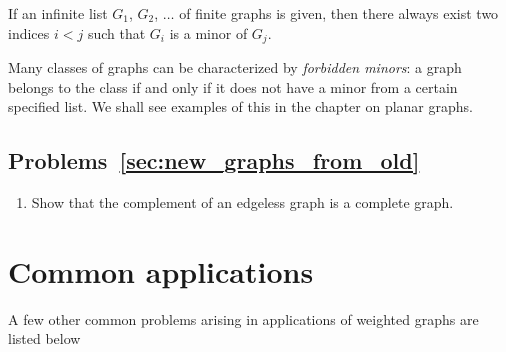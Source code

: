 \begin{theorem}
{\rm
If an infinite list $G_1$, $G_2$, $\dots$ of finite graphs is given, then there always exist two indices
$i < j$ such that $G_i$ is a minor of $G_j$.
}
\end{theorem}

Many classes of graphs can be characterized by {\it forbidden minors}: a
graph belongs to the class if and only if it does not have a minor
from a certain specified list.
We shall see examples of this in the chapter on planar graphs.



\subsection*{Problems~\ref{sec:new_graphs_from_old}}

\begin{enumerate}
\item Show that the complement of an edgeless graph is a complete
  graph.
\end{enumerate}



\section{Common applications}

A few other common problems arising in applications of weighted graphs
are listed below

